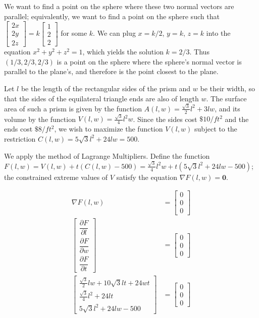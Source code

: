 We want to find a point on the sphere where these two normal vectors are
parallel; equivalently, we want to find a point on the sphere such that
$\begin{bmatrix} 2x \\ 2y \\ 2z \end{bmatrix}
 = k\begin{bmatrix} 1 \\ 2 \\ 2 \end{bmatrix}$ for some $k$.  We can plug
$x = k/2$, $y = k$, $z = k$ into the equation $x^2 + y^2 + z^2 = 1$, which
yields the solution $k = 2/3$.  Thus $(1/3, 2/3, 2/3)$ is a point on the
sphere where the sphere's normal vector is parallel to the plane's, and
therefore is the point closest to the plane.

\item

Let $l$ be the length
of the rectangular sides of the prism and $w$ be their width, so that
the sides of the equilateral triangle ends are also of length $w$.
The surface area of such a prism is given by the function $A(l,w) =
\frac{\sqrt{3}}{2}l^2 + 3lw$, and its volume by the function $V(l,w) =
\frac{\sqrt{3}}{4}l^2w$.  Since the sides cost $\$10/ft^2$ and the ends
cost $\$8/ft^2$, we wish to maximize the function $V(l,w)$ subject to
the restriction $C(l,w) = 5\sqrt{3}l^2 + 24lw = 500$.

We apply the method of Lagrange Multipliers.  Define the function
$F(l,w) = V(l,w) + t(C(l,w) - 500) =
\frac{\sqrt{3}}{4}l^2w + t(5\sqrt{3}l^2 + 24lw - 500)$;
the constrained extreme values of $V$ satisfy the equation
$\nabla F(l,w) = \mathbf{0}$.

\begin{align}
 \nabla F(l,w) &= \begin{bmatrix} 0 \\ 0 \\ 0 \end{bmatrix} \nonumber \\
 \begin{bmatrix}
  \dfrac{\partial F}{\partial l} \\
  \dfrac{\partial F}{\partial w} \\
  \dfrac{\partial F}{\partial t}
 \end{bmatrix} &= \begin{bmatrix} 0 \\ 0 \\ 0 \end{bmatrix} \nonumber \\
 \begin{bmatrix}
  \frac{\sqrt{3}}{2}lw + 10\sqrt{3}lt + 24wt \\
  \frac{\sqrt{3}}{4}l^2 + 24lt \\
  5\sqrt{3}l^2 + 24lw - 500
 \end{bmatrix} &= \begin{bmatrix} 0 \\ 0 \\ 0 \end{bmatrix} \label{soln:opt_box}
\end{align}

